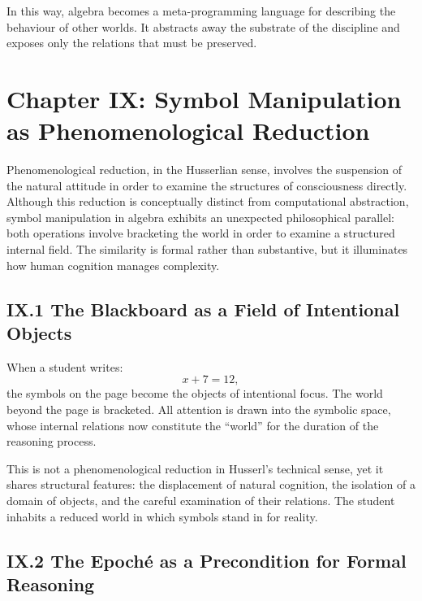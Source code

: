 \documentclass[12pt,letterpaper]{article}
\begin{document}
In this way, algebra becomes a meta-programming language for describing the behaviour of other worlds. It abstracts away the substrate of the discipline and exposes only the relations that must be preserved.

\newpage

\section{Chapter IX: Symbol Manipulation as Phenomenological Reduction}

Phenomenological reduction, in the Husserlian sense, involves the suspension of the natural attitude in order to examine the structures of consciousness directly. Although this reduction is conceptually distinct from computational abstraction, symbol manipulation in algebra exhibits an unexpected philosophical parallel: both operations involve bracketing the world in order to examine a structured internal field. The similarity is formal rather than substantive, but it illuminates how human cognition manages complexity.

\subsection{IX.1 The Blackboard as a Field of Intentional Objects}

When a student writes:
\[
x + 7 = 12,
\]
the symbols on the page become the objects of intentional focus. The world beyond the page is bracketed. All attention is drawn into the symbolic space, whose internal relations now constitute the ``world'' for the duration of the reasoning process.

This is not a phenomenological reduction in Husserl’s technical sense, yet it shares structural features: the displacement of natural cognition, the isolation of a domain of objects, and the careful examination of their relations. The student inhabits a reduced world in which symbols stand in for reality.

\subsection{IX.2 The Epoché as a Precondition for Formal Reasoning}
\end{document}
